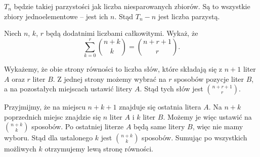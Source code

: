 $T_n$ będzie takiej parzystości jak liczba niesparowanych zbiorów. Są to wszystkie zbiory jednoelementowe -- jest ich $n$.  Stąd $T_n - n$ jest liczba parzystą.

\vspace{5px}

\begin{problem}{7}
	Niech $n$, $k$, $r$ będą dodatnimi liczbami całkowitymi. Wykaż, że
	\[
		\sum^{r}_{k=0} {{n + k}\choose{k}} = {{n + r + 1}\choose{r}} .
	\]
\end{problem}

\vspace{5px}

\noindent
Wykażemy, że obie strony równości to liczba słów, które składają się z $n + 1$ liter $A$ oraz $r$ liter $B$. Z jednej strony możemy wybrać na $r$ sposobów pozycje liter $B$, a na pozostałych miejscach ustawić litery $A$. Stąd tych słów jest ${{n + r + 1}\choose{r}}$.

Przyjmijmy, że na miejscu $n + k + 1$ znajduje się ostatnia litera $A$. Na $n + k$ poprzednich miejsc znajdzie się $n$ liter $A$ i $k$ liter $B$. Możemy je więc ustawić na ${{n + k}\choose{k}}$ sposobów. Po ostatniej literze $A$ będą same litery $B$, więc nie mamy wyboru. Stąd dla ustalonego $k$ jest ${{n + k}\choose{k}}$ sposobów. Sumując po wszystkich możliwych $k$ otrzymujemy lewą stronę równości.


